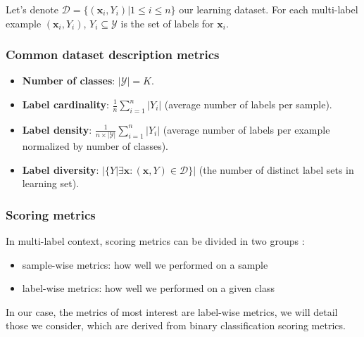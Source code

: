 Let's denote $\mathcal{D} = \{(\mathbf{x}_i, Y_i) | 1 \leq i \leq n\}$ our learning dataset. For each multi-label example $(\mathbf{x}_i, Y_i)$, $Y_i \subseteq \mathcal{Y}$ is the set of labels for $\mathbf{x}_i$.

\subsubsection{Common dataset description metrics}

\begin{itemize}
	\item \textbf{Number of classes}: $|\mathcal{Y}| = K$.
	\item \textbf{Label cardinality}: $\frac{1}{n}\sum_{i=1}^n |Y_i|$ (average number of labels per sample).
	\item \textbf{Label density}: $\frac{1}{n \times |\mathcal{Y}|}\sum_{i=1}^n |Y_i|$ (average number of labels per example normalized by number of classes).
	\item \textbf{Label diversity}: $|\{Y | \exists \mathbf{x}:(\mathbf{x}, Y) \in \mathcal{D}\}|$ (the number of distinct label sets in learning set).
\end{itemize}


\subsubsection{Scoring metrics}

In multi-label context, scoring metrics can be divided in two groups \cite{MultilabelReview}: 
\begin{itemize}
	\item sample-wise metrics: how well we performed on a sample
	\item label-wise metrics: how well we performed on a given class
\end{itemize}

In our case, the metrics of most interest are label-wise metrics, we will detail those we consider, which are derived from binary classification scoring metrics.  

